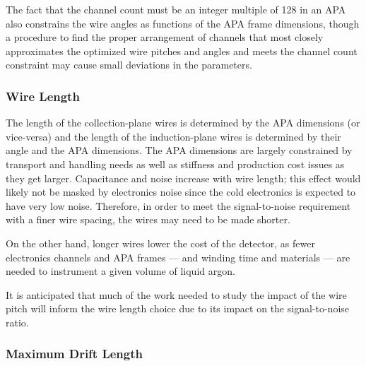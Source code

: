 The fact that the channel count must be an integer multiple of 128 in
an APA also constrains the wire angles as functions of the APA frame
dimensions, though a procedure to find the proper arrangement of
channels that most closely approximates the optimized wire pitches and
angles and meets the channel count constraint may cause small
deviations in the parameters.

\subsubsection{Wire Length}

The length of the collection-plane wires is determined by the APA
dimensions (or vice-versa) and the length of the induction-plane
wires is determined by their angle and the APA dimensions.  The APA
dimensions are largely constrained by transport and handling needs as
well as stiffness and production cost issues as they get larger.
Capacitance and noise increase with wire length; this effect would
likely not be masked by electronics noise since the cold electronics
is expected to have very low noise.  Therefore, in order to meet the
signal-to-noise requirement with a finer wire spacing, the wires may
need to be made shorter.

On the other hand, longer wires lower the cost of the detector, as
fewer electronics channels and APA frames --- and winding time and
materials --- are needed to instrument a given volume of liquid argon.

It is anticipated that much of the work needed to study the impact of
the wire pitch will inform the wire length choice due to its impact on
the signal-to-noise ratio.

\subsubsection{Maximum Drift Length}

% 

